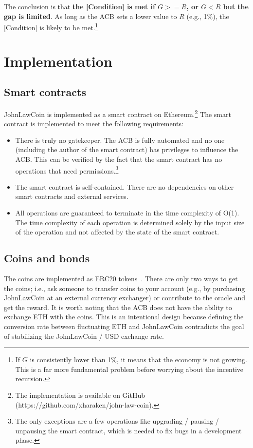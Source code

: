 \documentclass[dvipdfmx,a4paper]{article}
\begin{document}
The conclusion is that \textbf{the [Condition] is met if $G>=R$, or $G<R$ but the gap is limited}. As long as the ACB sets a lower value to $R$ (e.g., 1\%), the [Condition] is likely to be met.\footnote{If $G$ is consistently lower than 1\%, it means that the economy is not growing. This is a far more fundamental problem before worrying about the incentive recursion.}

\section{Implementation}

\subsection{Smart contracts}

JohnLawCoin is implemented as a smart contract on Ethereum.\footnote{The implementation is available on GitHub (https://github.com/xharaken/john-law-coin).} The smart contract is implemented to meet the following requirements:

\begin{itemize}
\item There is truly no gatekeeper. The ACB is fully automated and no one (including the author of the smart contract) has privileges to influence the ACB. This can be verified by the fact that the smart contract has no operations that need permissions.\footnote{The only exceptions are a few operations like upgrading / pausing / unpausing the smart contract, which is needed to fix bugs in a development phase.}
\item The smart contract is self-contained. There are no dependencies on other smart contracts and external services.
\item All operations are guaranteed to terminate in the time complexity of O(1). The time complexity of each operation is determined solely by the input size of the operation and not affected by the state of the smart contract.
\end{itemize}

\subsection{Coins and bonds}

The coins are implemented as ERC20 tokens~\cite{erc20token}. There are only two ways to get the coins; i.e., ask someone to transfer coins to your account (e.g., by purchasing JohnLawCoin at an external currency exchanger) or contribute to the oracle and get the reward. It is worth noting that the ACB does not have the ability to exchange ETH with the coins. This is an intentional design because defining the conversion rate between fluctuating ETH and JohnLawCoin contradicts the goal of stabilizing the JohnLawCoin / USD exchange rate.
\end{document}
